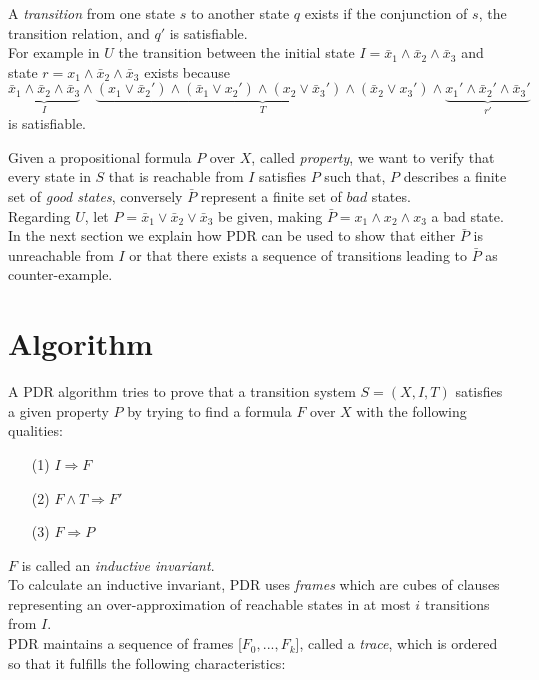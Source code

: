 \documentclass[11pt, a4paper, BCOR=10mm, ngerman]{scrbook}
\begin{document}
A \textsl{transition} from one state $s$ to another state $q$ exists if the conjunction of $s$, the transition relation, and $q'$ is satisfiable.\\ For example in $U$ the transition between the initial state $I = \bar x_1 \land \bar x_2 \land \bar x_3$ and state $r = x_1 \land \bar x_2 \land \bar x_3$ exists because
\begin{equation*}
\underbrace{\bar x_1 \land \bar x_2 \land \bar x_3}_{I} \land \underbrace{(x_1 \lor \bar x_2' ) \land ( \bar x_1 \lor x_2') \land (x_2 \lor \bar x_3') \land ( \bar x_2 \lor x_3')}_T \land \underbrace{x_1' \land \bar x_2' \land \bar x_3'}_{r'}
\end{equation*}
is satisfiable.\par

Given a propositional formula $P$ over $X$, called \textsl{property}, we want
to verify that every state in $S$ that is reachable from
$I$ satisfies $P$ such that, $P$ describes a finite set of \textsl{good states}, conversely $\bar P$ represent a finite set of $bad$ states.  \\ 
Regarding $U$, let $P = \bar x_1 \lor \bar x_2 \lor \bar x_3$ be given, making $\bar P = x_1 \land x_2 \land x_3$ a bad state. \\ 
In the next section we explain how PDR can be used to show that either $\bar P$ is unreachable from $I$ or that there exists a sequence of transitions leading to $\bar P$ as counter-example.

\section{Algorithm}
A PDR algorithm tries to prove that a transition system $S = (X, I, T)$ satisfies a given property $P$ by trying to find a formula $F$ over $X$ with the following qualities:
\begin{itemize}
\item[(1)] $I \Rightarrow F$
\item[(2)] $F \land T \Rightarrow F'$
\item[(3)] $F \Rightarrow P$
\end{itemize}
$F$ is called an \textsl{inductive invariant}. \\ 
To calculate an inductive invariant, PDR uses \textsl{frames} which are cubes of clauses representing an over-approximation of reachable states in at most $i$ transitions from $I$. \\
PDR maintains a sequence of frames [$F_0, ..., F_k$], called a \textsl{trace}, which is ordered so that it fulfills the following characteristics: 
\end{document}
